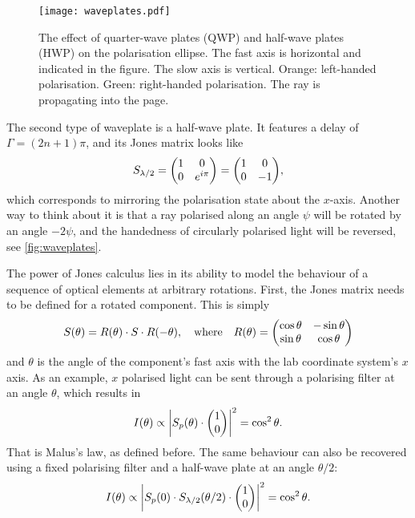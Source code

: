 \begin{figure}
	\centering
	\texttt{[image: waveplates.pdf]}
	\caption{
		The effect of quarter-wave plates (QWP) and half-wave plates (HWP) on the polarisation ellipse. The fast axis is horizontal and indicated in the figure. The slow axis is vertical. Orange: left-handed polarisation. Green: right-handed polarisation. The ray is propagating into the page.
	}
	\label{fig:waveplates}
\end{figure}

The second type of waveplate is a half-wave plate. It features a delay of $ \Gamma = (2n+1)\pi$, and its Jones matrix looks like
\begin{equation}
	S_\hwp = \mqty(1 & 0 \\ 0 & e^{i\pi}) = \mqty(1 & 0 \\ 0 & -1),
\end{equation}
which corresponds to mirroring the polarisation state about the $ x $-axis. Another way to think about it is that a ray polarised along an angle $ \psi$ will be rotated by an angle $ -2\psi$, and the handedness of circularly polarised light will be reversed, see \autoref{fig:waveplates}.

The power of Jones calculus lies in its ability to model the behaviour of a sequence of optical elements at arbitrary rotations. First, the Jones matrix needs to be defined for a rotated component. This is simply
\begin{equation}
	S(\theta) = R(\theta) \cdot S \cdot R(-\theta),
	\qq{where} 
	R(\theta) = \mqty(\cos\theta & -\sin\theta \\ \sin\theta & \cos\theta)
\end{equation}
and $ \theta $ is the angle of the component's fast axis with the lab coordinate system's $ x $ axis. As an example, $ x $ polarised light can be sent through a polarising filter at an angle $ \theta $, which results in
\begin{equation}
	I(\theta) \propto \abs{S_p(\theta) \cdot \mqty(1 \\ 0)}^2 = \cos^2\theta.
\end{equation}
That is Malus's law, as defined before. The same behaviour can also be recovered using a fixed polarising filter and a half-wave plate at an angle $ \theta/2 $:
\begin{equation}
	I(\theta) \propto \abs{S_p(0) \cdot S_\hwp(\theta/2) \cdot \mqty(\admat{1 \\ 0})}^2 = \cos^2\theta.
\end{equation}


